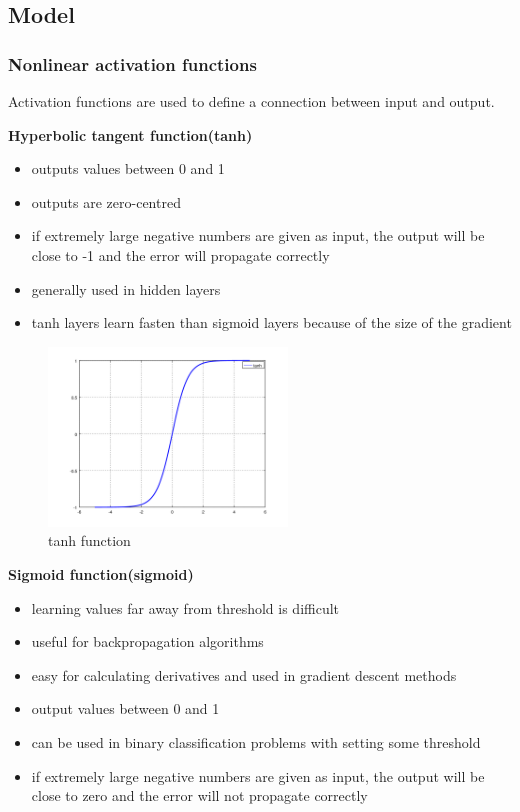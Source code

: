 \subsection{Model}
\label{model}


\subsubsection{Nonlinear activation functions\cite{david,hiddenfunctions,backprop}}
\label{transfer}
Activation functions are used to define a connection between input and output.

\textbf{Hyperbolic tangent function(tanh)}
\begin{itemize}
	\item outputs values between 0 and 1
	\item outputs are zero-centred
	\item if extremely large negative numbers are given as input, the output will be close to -1 and the error will propagate correctly
	\item generally used in hidden layers
	\item tanh layers learn fasten than sigmoid layers because of the size of the gradient
\end{itemize}

\begin{figure}[h]
	\begin{center}
		\includegraphics[width=240px,height=180px]{src/img/state/tanh}
		\caption{tanh function} \label{fig:tanh}
    \end{center}
\end{figure}


\textbf{Sigmoid function(sigmoid)}
\begin{itemize}
  \item learning values far away from threshold is difficult
  \item useful for backpropagation algorithms
  \item easy for calculating derivatives and used in gradient descent methods
  \item output values between 0 and 1
  \item can be used in binary classification problems with setting some threshold
  \item if extremely large negative numbers are given as input, the output will be close to zero and the error will not propagate correctly
\end{itemize}

